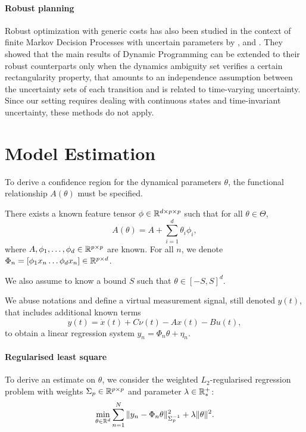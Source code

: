 \documentclass{article}
\begin{document}
\paragraph{Robust planning}
Robust optimization with generic costs has also been studied in the context of finite Markov Decision Processes with uncertain parameters by \citet{Iyengar2005}, \citet{Nilim2005} and \citet{Wiesemann2013}. They showed that the main results of Dynamic Programming can be extended to their robust counterparts only when the dynamics ambiguity set verifies a certain rectangularity property, that amounts to an independence assumption between the uncertainty sets of each transition and is related to time-varying uncertainty. Since our setting requires dealing with continuous states and time-invariant uncertainty, these methods do not apply.

\section{Model Estimation}

\label{sec:estimation}

To derive a confidence region for the dynamical parameters $\theta$, the functional relationship $A(\theta)$ must be specified.
\begin{assumption}[Structure]
\label{assumpt:structure}
There exists a known feature tensor $\phi\in \mathbb{R}^{d \times p \times p}$ such that for all $\theta\in\Theta$,
\begin{equation}
    A(\theta) = A + %
    \sum_{i=1}^d \theta_i\phi_i,
\end{equation}
where $A,\phi_1,\dots,\phi_d\in\mathbb{R}^{p\times p}$ are known. For all $n$, we denote $\Phi_n = [\phi_1 x_n \dots \phi_d x_n]\in\mathbb{R}^{p\times d}$.

We also assume to know a bound $S$ such that $\theta\in[-S,S]^d$.
\end{assumption}

We abuse notations and define a virtual measurement signal, still denoted $y(t)$, that includes additional known terms
\begin{equation*}
    y(t) = \dot{x}(t) + C\nu(t) - A x(t) - Bu(t),
\end{equation*}
to obtain a linear regression system
$
y_n = \Phi_n\theta + \eta_n.
$

\paragraph{Regularised least square} To derive an estimate on $\theta$, we consider the weighted $L_2$-regularised regression problem with weights  $\Sigma_p\in\mathbb{R}^{p\times p}$ and parameter $\lambda\in\mathbb{R}^+_*$:
\begin{equation}
    \label{eq:regression_min}
    \min_{\theta\in\mathbb{R}^d} \sum_{n=1}^N \|y_n -\Phi_n\theta\|_{\Sigma_p^{-1}}^2 + \lambda\|\theta\|_{}^2.
\end{equation}
\end{document}
